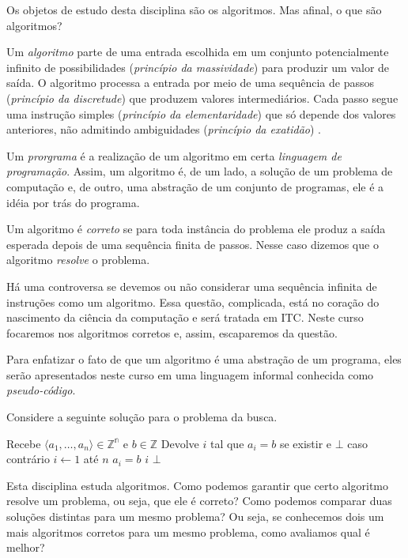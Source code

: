 Os objetos de estudo desta disciplina são os algoritmos.
Mas afinal, o que são algoritmos?

Um {\em algoritmo} parte de uma entrada escolhida em um conjunto potencialmente infinito de possibilidades ({\em princípio da massividade}) para produzir um valor de saída.
O algoritmo processa a entrada por meio de uma sequência de passos ({\em princípio da discretude}) que produzem valores intermediários.
Cada passo  segue uma instrução simples ({\em princípio da elementaridade}) que só depende dos valores anteriores, não admitindo ambiguidades ({\em princípio da exatidão}) \cite{malcev70}.

Um {\em prorgrama} é a realização de um algoritmo em certa {\em linguagem de programação}.
Assim, um algoritmo é, de um lado, a solução de um problema de computação e, de outro, uma abstração de um conjunto de programas, ele é a idéia por trás do programa.

Um algoritmo é {\em correto} se para toda instância do problema ele produz a saída esperada depois de uma sequência finita de passos.
Nesse caso dizemos que o algoritmo {\em resolve} o problema.

Há uma controversa se devemos ou não considerar uma sequência infinita de instruções como um algoritmo.
Essa questão, complicada, está no coração do nascimento da ciência da computação e será tratada em ITC.
Neste curso focaremos nos algoritmos corretos e, assim, escaparemos da questão.

Para enfatizar o fato de que um algoritmo é uma abstração de um programa, eles serão apresentados neste curso em uma linguagem informal conhecida como {\em pseudo-código}.

\begin{example}
  Considere a seguinte solução para o problema da busca.

\begin{codebox}
\li \Comment Recebe $\langle a_1, \dots, a_n \rangle \in \mathbb{Z^n}$ e $b \in \mathbb{Z}$
\li \Comment Devolve $i$ tal que $a_i = b$ se existir e $\bot$ caso contrário
\li \For $i \gets 1$ até $n$
\li \Do \If $a_i = b$
\li     \Then \Return $i$
        \End
    \End
\li \Return $\bot$
\End
\end{codebox}
  
\end{example}

Esta disciplina estuda algoritmos.
Como podemos garantir que certo algoritmo resolve um problema, ou seja, que ele é correto?
Como podemos comparar duas soluções distintas para um mesmo problema?
Ou seja, se conhecemos dois um mais algoritmos corretos para um mesmo problema, como avaliamos qual é melhor?

